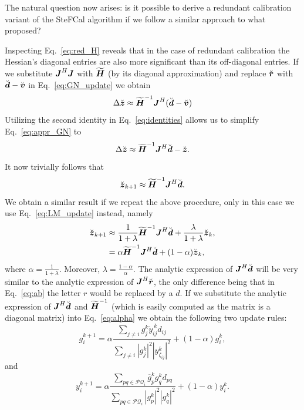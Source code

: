 \documentclass[useAMS,usenatbib]{mn2e}
\newcommand{\bz}{\bmath{z}}
\newcommand{\br}{\bmath{r}}
\newcommand{\bd}{\bmath{d}}
\newcommand{\bv}{\bmath{v}}
\newcommand{\bJ}{\bmath{J}}
\newcommand{\bH}{\bmath{H}}
\newcommand{\conj}[1]{\overline{#1}}
\begin{document}
The natural question now arises: is it possible to derive a redundant calibration variant of the SteFCal algorithm if we follow a similar approach to what \citet{Smirnov2015}
proposed?

Inspecting Eq.~\eqref{eq:red_H} reveals that in the case of redundant calibration the Hessian's diagonal entries are also more significant than its off-diagonal entries.
If we substitute $\bJ^H\bJ$ with $\widetilde{\bH}$ (by its diagonal approximation) and replace $\breve{\br}$ with $\breve{\bd} - \breve{\bv}$ in Eq.~\eqref{eq:GN_update} we obtain
\begin{equation}
\label{eq:appr_GN}
 \Delta \breve{\bz} \approx \widetilde{\bH}^{-1}\bJ^H(\breve{\bd}-\breve{\bv})
\end{equation}
Utilizing the second identity in Eq.~\eqref{eq:identities} allows us to simplify Eq.~\eqref{eq:appr_GN} to
\begin{equation}
  \Delta \breve{\bz} \approx \widetilde{\bH}^{-1}\bJ^H\breve{\bd}-\breve{\bz}.
\end{equation}
It now trivially follows that
\begin{equation}
 \breve{\bz}_{k+1} \approx \widetilde{\bH}^{-1}\bJ^H\breve{\bd}.
\end{equation}
We obtain a similar result if we repeat the above procedure, only in this case we use Eq.~\eqref{eq:LM_update} instead,
namely
\begin{align}
\breve{\bz}_{k+1} &\approx \frac{1}{1+\lambda}\widetilde{\bH}^{-1}\bJ^H\breve{\bd} + \frac{\lambda}{1+\lambda} \breve{\bz}_k,\label{eq:lambda}\\
 &= \alpha \widetilde{\bH}^{-1}\bJ^H\breve{\bd} + (1-\alpha)\breve{\bz}_k, \label{eq:alpha}  
\end{align}
where $\alpha = \frac{1}{1+\lambda}$. Moreover, $\lambda = \frac{1-\alpha}{\alpha}$. The analytic expression of $\bJ^H\breve{\bd}$ will be very similar to the analytic 
expression of $\bJ^H\breve{\br}$, the only difference being that in Eq.~\eqref{eq:ab} the letter $r$ would be replaced by a $d$. If we substitute the analytic expression
of $\bJ^H\breve{\bd}$ and $\widetilde{\bH}^{-1}$ (which is easily computed as the matrix is a diagonal matrix) into Eq.~\eqref{eq:alpha} we obtain the following two update rules:
\begin{equation}
\label{eq:g_update}
g_{i}^{k+1} = \alpha \frac{\sum_{j\neq i} g_j^k \widetilde{y}_{ij}^{~\!\!k} d_{ij}}{\sum_{j\neq i} |g_j^k|^2|y_{\zeta_{ij}}^k|^2} + (1-\alpha) g_i^k, 
\end{equation}
and
\begin{equation}
\label{eq:y_update}
y_{i}^{k+1} = \alpha \frac{\sum_{pq \in \mathcal{PQ}_i} \conj{g}_p^k g_q^k d_{pq}}{\sum_{pq \in \mathcal{PQ}_i}|g_p^k|^2|g_q^k|^2} + (1-\alpha) y_i^k. 
\end{equation}
\end{document}
